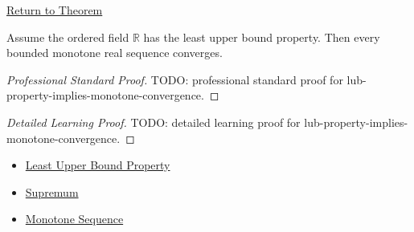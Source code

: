 \newpage
{}
\label{prf:lub-property-implies-monotone-convergence}

\begin{remark*}[Return]
\hyperref[thm:lub-property-implies-monotone-convergence]{Return to Theorem}
\end{remark*}

\begin{theorem*}
Assume the ordered field $\mathbb{R}$ has the least upper bound property. Then
every bounded monotone real sequence converges.
\end{theorem*}

\begin{proof}[Professional Standard Proof]
\LRAProofBodyStart
TODO: professional standard proof for lub-property-implies-monotone-convergence.
\end{proof}

\begin{proof}[Detailed Learning Proof]
\LRAProofBodyStart
TODO: detailed learning proof for lub-property-implies-monotone-convergence.
\end{proof}

\begin{remark*}
\end{remark*}

\begin{dependencies}
\begin{itemize}
  \item \hyperref[def:least-upper-bound-property]{Least Upper Bound Property}
  \item \hyperref[def:supremum]{Supremum}
  \item \hyperref[def:monotone-sequence]{Monotone Sequence}
\end{itemize}
\end{dependencies}

\clearpage
